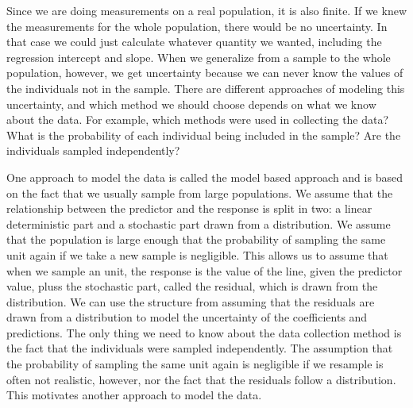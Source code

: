 \documentclass{article}
\begin{document}
Since we are doing measurements on a real population, it is also finite.
If we knew the measurements for the whole population, there
would be no uncertainty. In that case we could just calculate whatever quantity we
wanted, including the regression intercept and slope. When we generalize from a sample to the whole population, however, we get
uncertainty because we can never know the values of the individuals not in the sample. There are different approaches of modeling this uncertainty, and
which method we should choose depends on what we know about the data. For example, which
methods were used in collecting the data?
What is the probability of each
individual being included in the sample? Are the individuals sampled independently? 

One approach to model the data is called the model based approach and is based
on the fact that we usually sample from large populations. We assume that the
relationship between the predictor and the response is split in two: a linear deterministic
part and a stochastic part drawn from a distribution. We assume that the population
is large enough that the probability of sampling the same unit again if we take
a new sample is negligible. This allows us to assume that when we sample an unit, 
the response is the value of the line, given the predictor value, pluss the stochastic
part, called the residual, which is drawn from the distribution. We can use the
structure from assuming that the residuals are drawn from a distribution to
model the uncertainty of the coefficients and predictions. The only thing we need
to know about the data collection method is the fact that the individuals were
sampled independently. The assumption that the
probability of sampling the same unit again is negligible if we resample is often not
realistic, however, nor the fact that the residuals follow a
distribution. This motivates another approach to model the data. 


\end{document}
